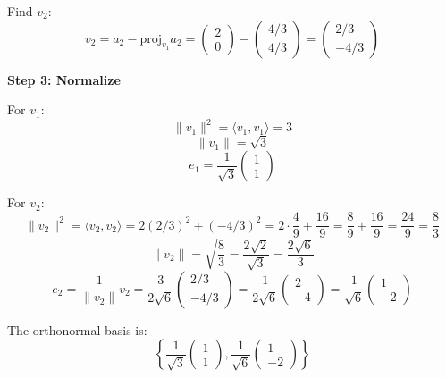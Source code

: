 \documentclass[12pt]{article}
\begin{document}
Find $v_2$:
\[
v_2 = a_2 - \text{proj}_{v_1} a_2 = \begin{pmatrix} 2 \\ 0 \end{pmatrix} - \begin{pmatrix} 4/3 \\ 4/3 \end{pmatrix} = \begin{pmatrix} 2/3 \\ -4/3 \end{pmatrix}
\]

\textbf{Step 3: Normalize}

For $v_1$:
\[
\|v_1\|^2 = \langle v_1, v_1 \rangle = 3
\]
\[
\|v_1\| = \sqrt{3}
\]
\[
e_1 = \frac{1}{\sqrt{3}} \begin{pmatrix} 1 \\ 1 \end{pmatrix}
\]

For $v_2$:
\[
\|v_2\|^2 = \langle v_2, v_2 \rangle = 2(2/3)^2 + (-4/3)^2 = 2 \cdot \frac{4}{9} + \frac{16}{9} = \frac{8}{9} + \frac{16}{9} = \frac{24}{9} = \frac{8}{3}
\]
\[
\|v_2\| = \sqrt{\frac{8}{3}} = \frac{2\sqrt{2}}{\sqrt{3}} = \frac{2\sqrt{6}}{3}
\]
\[
e_2 = \frac{1}{\|v_2\|} v_2 = \frac{3}{2\sqrt{6}} \begin{pmatrix} 2/3 \\ -4/3 \end{pmatrix} = \frac{1}{2\sqrt{6}} \begin{pmatrix} 2 \\ -4 \end{pmatrix} = \frac{1}{\sqrt{6}} \begin{pmatrix} 1 \\ -2 \end{pmatrix}
\]

The orthonormal basis is:
\[
\left\{ \frac{1}{\sqrt{3}} \begin{pmatrix} 1 \\ 1 \end{pmatrix}, \frac{1}{\sqrt{6}} \begin{pmatrix} 1 \\ -2 \end{pmatrix} \right\}
\]
\end{document}

